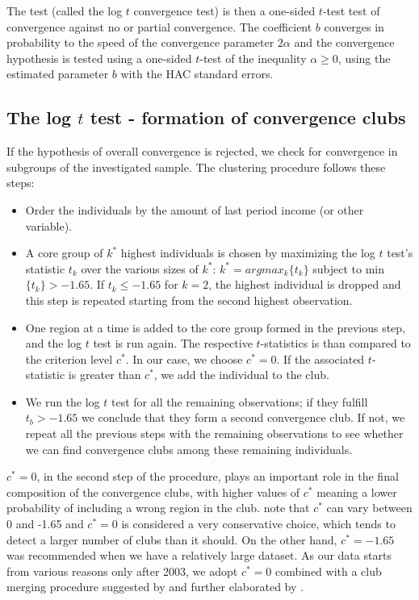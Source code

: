 \documentclass[11pt]{article}
\begin{document}
The test (called the log $t$ convergence test) is then a one-sided $t$-test test of convergence against no or partial convergence. The coefficient $b$ converges in probability to the speed of the convergence parameter $2\alpha$ and the convergence hypothesis is tested using a one-sided $t$-test of the inequality \(\alpha \geq 0 \), using the estimated parameter $b$ with the HAC standard errors.%

\subsection{The log $t$ test - formation of convergence clubs }
If the hypothesis of overall convergence is rejected, we check for convergence in subgroups of the investigated sample. The clustering procedure follows these steps:
\begin{itemize}
    \item Order the individuals by the amount of last period income (or other variable).
    \item  A core group of $k^{*}$ highest individuals is chosen by maximizing the log $t$ test's statistic $t_{k}$ over the various sizes of $k^{*}$:
    \(k^{*} = arg max_{k}\{t_{k}\}\) subject to min \( \{t_{k}\}> -1.65\). If \(t_{k} \leq -1.65 \) for \(k=2\), the highest individual is dropped and this step is repeated starting from the second highest observation. 
    \item One region at a time is added to the core group formed in the previous step, and the log $t$ test is run again. The respective  $t$-statistics is than compared to the criterion level $c^{*}$. In our case, we choose $c^{*}=0$. If the associated $t$-statistic is greater than  $c^{*}$, we add the individual to the club.
    \item We run the log $t$ test for all the remaining observations; if they fulfill \(t_b > -1.65\) we conclude that they form a second convergence club. If not, we repeat all the previous steps with the remaining observations to see whether we can find convergence clubs among these remaining individuals.
\end{itemize}    

 \(c^{*} = 0\), in the second step of the procedure, plays an important role in the final composition of the convergence clubs, with higher values of $c^*$ meaning a lower probability of including a wrong region in the club. \citet{phillips2009economic} note that $c^{*}$ can vary between 0 and -1.65 and $c^{*}=0$ is considered a very conservative choice, which tends to detect a larger number of clubs than it should. On the other hand, $c^{*}=-1.65$ was recommended when we have a relatively large dataset. As our data starts from various reasons only after 2003, we adopt $c^*= 0$ combined with a club merging procedure suggested by \citet{phillips2009economic} and further elaborated by \citet{bartkowska2012regional}. 
\end{document}
